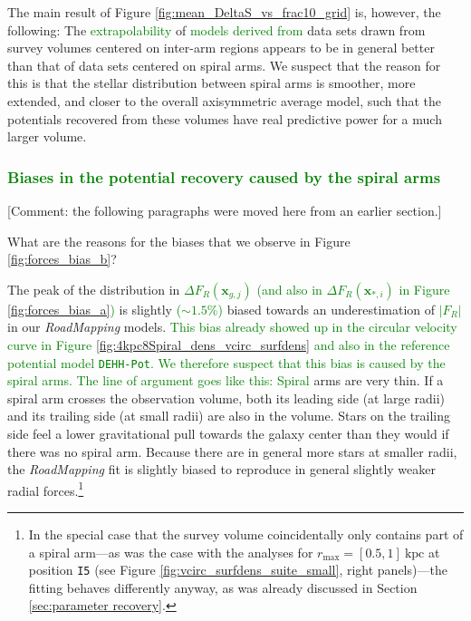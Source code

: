 \documentclass[iop,revtex4,numberedappendix,appendixfloats]{emulateapj}
\newcommand{\vect}[1]{\boldsymbol{#1}}
\newcommand{\RM}{{\sl RoadMapping}}
\newcommand{\NEW}[1]{\textcolor{Green}{#1}}
\newcommand{\OLD}[1]{}
\newcommand{\COMMENT}[1]{\textcolor{ProcessBlue}{#1}}
\begin{document}

The main result of Figure \ref{fig:mean_DeltaS_vs_frac10_grid} is, however, the following: The \OLD{predictive power}\NEW{extrapolability} of \NEW{models derived from} data sets drawn from survey volumes centered on inter-arm regions appears to be in general \OLD{much} better than that of data sets centered on spiral arms. We suspect that the reason for this is that the stellar distribution between spiral arms is smoother, more extended, and closer to the overall axisymmetric average model, such that the potentials recovered from these volumes have real predictive power for a much larger volume. \OLD{This is an important result.}

\subsubsection{\NEW{Biases in the potential recovery caused by the spiral arms}} \label{sec:biases_explained}

\COMMENT{[Comment: the following paragraphs were moved here from an earlier section.]}

What are the reasons for the biases that we observe in Figure \OLD{\ref{fig:forces_bias}}\NEW{\ref{fig:forces_bias_b}}? 

The peak of the distribution in \OLD{$\Delta F_R(*_i)$ and} \OLD{$\Delta F_R(g_j)$}\NEW{$\Delta F_R(\vect{x}_{g,j})$} \NEW{(and also in $\Delta F_R(\vect{x}_{*,i})$ in Figure \ref{fig:forces_bias_a})} is slightly \NEW{($\sim1.5\%$)} biased towards an underestimation of \OLD{$|F_{R,M}|$}\NEW{$|F_{R}|$} in our \RM{} models. \NEW{This bias already showed up in the circular velocity curve in Figure \ref{fig:4kpc8Spiral_dens_vcirc_surfdens} and also in the reference potential model \texttt{DEHH-Pot}. We therefore suspect that this bias is caused by the spiral arms. The line of argument goes like this: Spiral}\OLD{We believe the explanation for this to be the fact that spiral} arms are very thin. If a spiral arm crosses the observation volume, both its leading side (at large radii) and its trailing side (at small radii) are also in the volume. Stars on the trailing side feel a lower gravitational pull towards the galaxy center than they would if there was no spiral arm. Because there are in general more stars at smaller radii, the \RM{} fit is slightly biased to reproduce in general slightly weaker radial forces\OLD{ (see also Figures \ref{fig:4kpc8Spiral_vcirc_surfdens} and \ref{fig:4kpc8Spiral_forces})}.\footnote{In the special case that the survey volume coincidentally only contains part of a spiral arm---as was the case with the analyses for $r_\text{max}=[0.5,1]~\text{kpc}$ at position \texttt{I5} (see Figure \ref{fig:vcirc_surfdens_suite_small}, right panels)---the fitting behaves differently anyway, as was already discussed in Section \ref{sec:parameter recovery}.}
\end{document}
